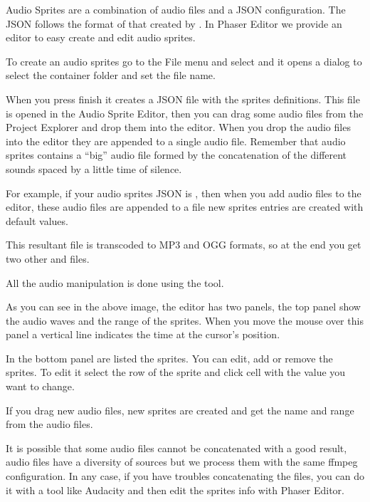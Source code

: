 \documentclass[letterpaper,10pt,english]{sphinxmanual}
\begin{document}
Audio Sprites are a combination of audio files and a JSON configuration. The JSON follows the format of that created by . In Phaser Editor we provide an editor to easy create and edit audio sprites.

To create an audio sprites go to the File menu and select  and it opens a dialog to select the container folder and set the file name.

\noindent{}

When you press finish it creates a JSON file with the sprites definitions. This file is opened in the Audio Sprite Editor, then you can drag some audio files from the Project Explorer and drop them into the editor. When you drop the audio files into the editor they are appended to a single audio file. Remember that audio sprites contains a “big” audio file formed by the concatenation of the different sounds spaced by a little time of silence.

For example, if your audio sprites JSON is , then when you add audio files to the editor, these audio files are appended to a  file new sprites entries are created with default values.

This resultant  file is transcoded to MP3 and OGG formats, so at the end you get two other  and  files.

All the audio manipulation is done using the  tool.

\noindent{}

As you can see in the above image, the editor has two panels, the top panel show the audio waves and the range of the sprites. When you move the mouse over this panel a vertical line indicates the time at the cursor’s position.

In the bottom panel are listed the sprites. You can edit, add or remove the sprites. To edit it select the row of the sprite and click cell with the value you want to change.

If you drag new audio files, new sprites are created and get the name and range from the audio files.

It is possible that some audio files cannot be concatenated with a good result, audio files have a diversity of sources but we process them with the same ffmpeg configuration. In any case, if you have troubles concatenating the files, you can do it with a tool like Audacity and then edit the sprites info with Phaser Editor.
\end{document}
